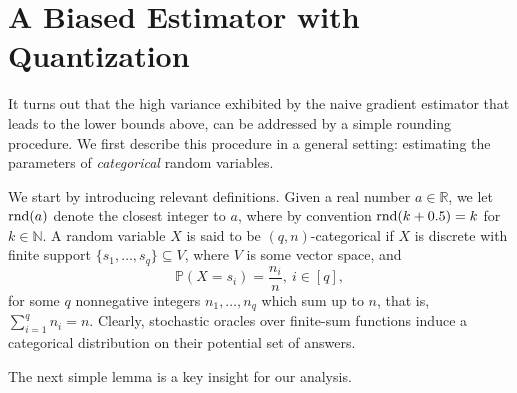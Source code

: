 \documentclass{article}
\theoremstyle{definition}  \newtheorem{exercise}{Exercise}
\theoremstyle{plain}
\newcommand{\RR}{\mathbb{R}}
\newcommand{\PP}{\mathbb{P}}
\DeclarePairedDelimiter{\prn}{(}{)}
\newcommand{\rnd}[1]{\operatorname{rnd}\prn*{#1}}
\newcommand{\NN}{\mathbb{N}}
\theoremstyle{definition}
\theoremstyle{remark}
\begin{document}
	 	\section{A Biased Estimator with 
	Quantization}\label{sec:estimator}
	
	It turns out that the high variance exhibited by the 
	naive gradient estimator that leads to the lower bounds above, can be addressed by a simple rounding procedure. We first describe 
	this procedure in a general setting:
estimating the parameters of \emph{categorical} random 
	variables.
	
	
	We start by introducing relevant definitions. Given a real 
	number $a\in\RR$, we let $\rnd{a}$ denote the closest integer 
	to $a$, where by convention $\rnd{k+0.5} = k$ for $k \in \NN$.  
	A random variable $X$ is said to be $(q,n)$-{categorical} if 
	$X$ is discrete with finite support  
	$\{s_1,\dots,s_q\}\subseteq V$, where $V$ is some vector 
	space, and 
	\[ \PP(X=s_i)=\frac{n_i}{n},~i\in[q] ,\]
	for some $q$ nonnegative integers $n_1 ,\dots,n_q$ which sum up 
	to $n$, that is, $\sum_{i=1}^q n_i=n$. Clearly,	
	stochastic oracles over finite-sum functions induce a 
	categorical distribution on their potential set of 
	answers. 
	
	The next simple lemma is a key insight for our analysis.
\end{document}
